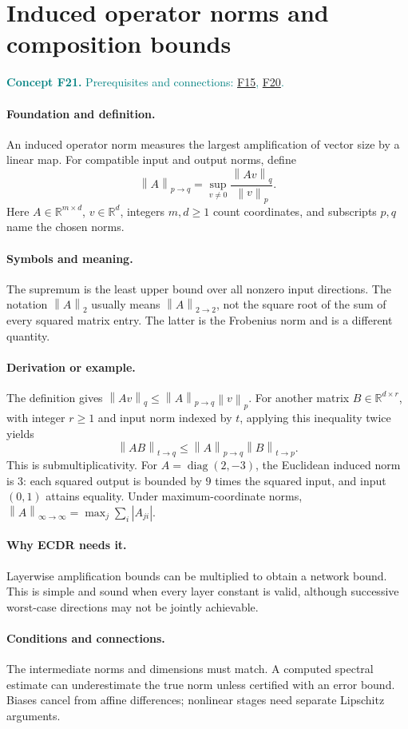 \documentclass[11pt,a4paper]{article}
\newcommand{\R}{\mathbb R}
\newcommand{\norm}[1]{\left\lVert#1\right\rVert}
\newcommand{\conceptid}{Front matter}
\newcommand{\concept}[3]{\clearpage\renewcommand{\conceptid}{#1}%
\section{#2}\label{concept:#1}%
\textcolor{teal}{\textbf{Concept #1.} Prerequisites and connections: #3.}\par
\typeout{ECDR-CONCEPT-START #1 PAGE=\thepage}}
\begin{document}
\concept{F21}{Induced operator norms and composition bounds}{\hyperref[concept:F15]{F15}, \hyperref[concept:F20]{F20}}
\paragraph{Foundation and definition.}
An induced operator norm measures the largest amplification of vector
size by a linear map. For compatible input and output norms, define
\[
 \norm{A}_{p\to q}
 =\sup_{v\ne0}\frac{\norm{Av}_q}{\norm{v}_p}.
\]
Here $A\in\R^{m\times d}$, $v\in\R^d$, integers $m,d\ge1$
count coordinates, and subscripts $p,q$ name the chosen norms.
\paragraph{Symbols and meaning.}
The supremum is the least upper bound over all nonzero input directions.
The notation $\norm{A}_2$ usually means $\norm{A}_{2\to2}$, not
the square root of the sum of every squared matrix entry. The latter is
the Frobenius norm and is a different quantity.
\paragraph{Derivation or example.}
The definition gives $\norm{Av}_q\le\norm{A}_{p\to q}\norm{v}_p$.
For another matrix $B\in\R^{d\times r}$, with integer $r\ge1$ and
input norm indexed by $t$, applying this inequality twice yields
\[
 \norm{AB}_{t\to q}
 \le\norm{A}_{p\to q}\norm{B}_{t\to p}.
\]
This is submultiplicativity. For
$A=\operatorname{diag}(2,-3)$, the Euclidean induced norm is $3$:
each squared output is bounded by $9$ times the squared input, and
input $(0,1)$ attains equality. Under maximum-coordinate norms,
$\norm{A}_{\infty\to\infty}=\max_j\sum_i|A_{ji}|$.
\paragraph{Why ECDR needs it.}
Layerwise amplification bounds can be multiplied to obtain a network
bound. This is simple and sound when every layer constant is valid,
although successive worst-case directions may not be jointly achievable.
\paragraph{Conditions and connections.}
The intermediate norms and dimensions must match. A computed spectral
estimate can underestimate the true norm unless certified with an error
bound. Biases cancel from affine differences; nonlinear stages need
separate Lipschitz arguments.
\par\label{endconcept:F21}
\end{document}
